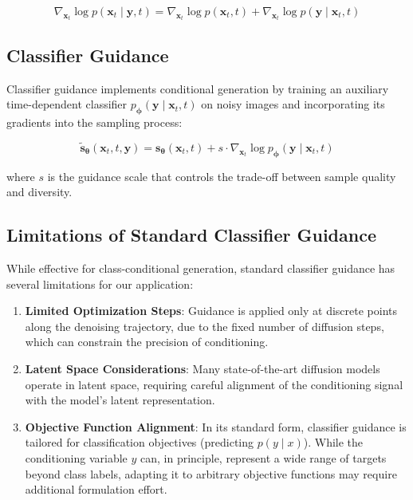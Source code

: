 \documentclass[licencjacka,en]{pracamgr}
\begin{document}
\begin{equation}
\nabla_{\mathbf{x}_t} \log p(\mathbf{x}_t \mid \mathbf{y}, t) = \nabla_{\mathbf{x}_t} \log p(\mathbf{x}_t, t) + \nabla_{\mathbf{x}_t} \log p(\mathbf{y} \mid \mathbf{x}_t, t)
\label{eq:conditional_score}
\end{equation}

\subsection{Classifier Guidance}

Classifier guidance \citep{dhariwal2021diffusionmodelsbeatgans} implements conditional generation by training an auxiliary time-dependent classifier $p_{\boldsymbol{\phi}}(\mathbf{y} \mid \mathbf{x}_t, t)$ on noisy images and incorporating its gradients into the sampling process:

\begin{equation}
\tilde{\mathbf{s}}_{\boldsymbol{\theta}}(\mathbf{x}_t, t, \mathbf{y}) = \mathbf{s}_{\boldsymbol{\theta}}(\mathbf{x}_t, t) + s \cdot \nabla_{\mathbf{x}_t} \log p_{\boldsymbol{\phi}}(\mathbf{y} \mid \mathbf{x}_t, t)
\label{eq:classifier_guidance}
\end{equation}

where $s$ is the guidance scale that controls the trade-off between sample quality and diversity.

\subsection{Limitations of Standard Classifier Guidance}

While effective for class-conditional generation, standard classifier guidance has several limitations for our application:

\begin{enumerate}
\item \textbf{Limited Optimization Steps}: Guidance is applied only at discrete points along the denoising trajectory, due to the fixed number of diffusion steps, which can constrain the precision of conditioning.

\item \textbf{Latent Space Considerations}: Many state-of-the-art diffusion models operate in latent space, requiring careful alignment of the conditioning signal with the model’s latent representation.

\item \textbf{Objective Function Alignment}: In its standard form, classifier guidance is tailored for classification objectives (predicting $p(y \mid x)$). While the conditioning variable $y$ can, in principle, represent a wide range of targets beyond class labels, adapting it to arbitrary objective functions may require additional formulation effort.
\end{enumerate}
\end{document}
